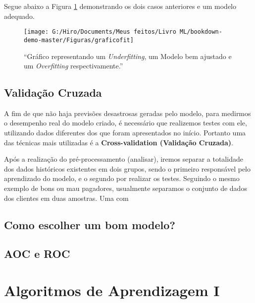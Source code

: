 \documentclass[
]{book}
\begin{document}
Segue abaixo a Figura \ref{fig:graficofit} demonstrando os dois casos anteriores e um modelo adequado.

\begin{figure}

{\centering \texttt{[image: G:/Hiro/Documents/Meus feitos/Livro ML/bookdown-demo-master/Figuras/graficofit]} 

}

\caption{``Gráfico representando um \emph{Underfitting}, um Modelo bem ajustado e um \emph{Overfitting} respectivamente.''}\label{fig:graficofit}
\end{figure}



\hypertarget{validauxe7uxe3o-cruzada}{%
\section{Validação Cruzada}\label{validauxe7uxe3o-cruzada}}

A fim de que não haja previsões desastrosas geradas pelo modelo, para medirmos o desempenho real do modelo criado, é necessário que realizemos testes com ele, utilizando dados diferentes dos que foram apresentados no início. Portanto uma das técnicas mais utilizadas é a \textbf{Cross-validation (Validação Cruzada)}.

Após a realização do pré-processamento (analisar), iremos separar a totalidade dos dados históricos existentes em dois grupos, sendo o primeiro responsável pelo aprendizado do modelo, e o segundo por realizar os testes.
Seguindo o mesmo exemplo de bons ou mau pagadores, usualmente separamos o conjunto de dados dos clientes em duas amostras. Uma com

\hypertarget{como-escolher-um-bom-modelo}{%
\section{Como escolher um bom modelo?}\label{como-escolher-um-bom-modelo}}

\hypertarget{aocroc}{%
\section{AOC e ROC}\label{aocroc}}

\hypertarget{Algoritmosaprendizagem}{%
\chapter{Algoritmos de Aprendizagem I}\label{Algoritmosaprendizagem}}
\end{document}

